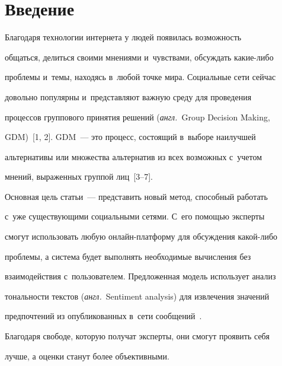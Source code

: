       


      \vspace*{-18pt} 


  


\section{Введение}





\vspace*{-3pt}





  Благодаря технологии интернета у людей появилась возможность 


общаться, делиться своими мнениями и~чувствами, обсуждать какие-либо 


проблемы и~темы, находясь в~любой точке мира. Социальные сети сейчас 


довольно популярны и~представляют важную среду для проведения 


процессов группового принятия решений (\textit{англ.}\ Group Decision Making, 


GDM)~[1, 2]. GDM~--- это процесс, состоящий в~выборе наилучшей 


альтернативы или множества альтернатив из всех возможных с~учетом 


мнений, выраженных группой лиц~[3--7]. 


  


  Основная цель статьи~--- представить новый метод, способный работать 


  с~уже существующими социальными сетями.  С~его помощью эксперты 


смогут использовать любую онлайн-платформу для обсуждения какой-либо 


проблемы, а система будет выполнять необходимые вычисления без 


взаимодействия с~пользователем.  Предложенная модель использует анализ 


тональности текстов (\textit{англ.}\ Sentiment analysis) для извлечения значений 


предпочтений из опубликованных в~сети сообщений~\cite{8-g, 9-g}. 


Благодаря свободе, которую получат эксперты, они смогут проявить себя 


лучше, а оценки станут более объективными.


